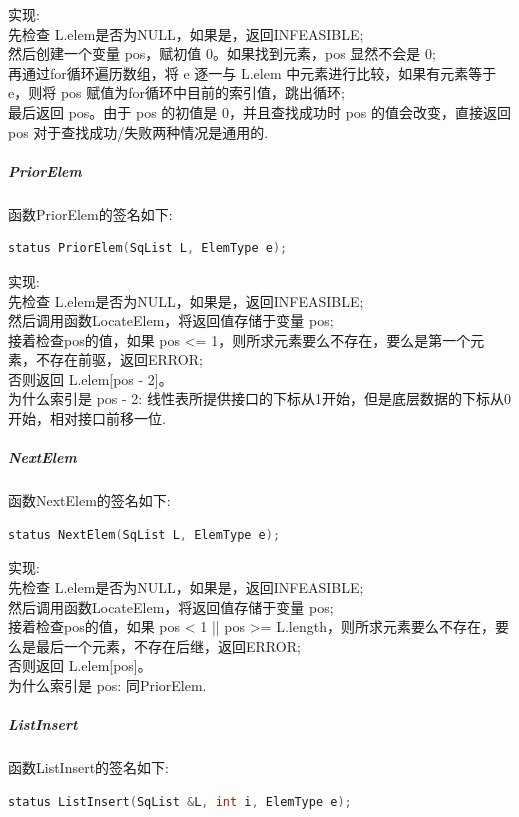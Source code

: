 \documentclass[supercite]{Experimental_Report}
\theoremstyle{definition}
\begin{document}
\noindent
实现: \\
先检查 L.elem是否为NULL，如果是，返回INFEASIBLE; \\
然后创建一个变量 pos，赋初值 0。如果找到元素，pos 显然不会是 0; \\
再通过for循环遍历数组，将 e 逐一与 L.elem 中元素进行比较，如果有元素等于 e，则将 pos 赋值为for循环中目前的索引值，跳出循环; \\
最后返回 pos。由于 pos 的初值是 0，并且查找成功时 pos 的值会改变，直接返回 pos 对于查找成功/失败两种情况是通用的.\\

\subparagraph{PriorElem}
\noindent
函数PriorElem的签名如下:
\begin{lstlisting}[language=C++, frame=single]
status PriorElem(SqList L, ElemType e);
\end{lstlisting}

\noindent
实现: \\
先检查 L.elem是否为NULL，如果是，返回INFEASIBLE; \\
然后调用函数LocateElem，将返回值存储于变量 pos; \\
接着检查pos的值，如果 pos <= 1，则所求元素要么不存在，要么是第一个元素，不存在前驱，返回ERROR; \\
否则返回 L.elem[pos - 2]。\\
为什么索引是 pos - 2: 线性表所提供接口的下标从1开始，但是底层数据的下标从0开始，相对接口前移一位.\\

\subparagraph{NextElem}
\noindent
函数NextElem的签名如下:
\begin{lstlisting}[language=C++, frame=single]
status NextElem(SqList L, ElemType e);
\end{lstlisting}

\noindent
实现: \\
先检查 L.elem是否为NULL，如果是，返回INFEASIBLE; \\
然后调用函数LocateElem，将返回值存储于变量 pos; \\
接着检查pos的值，如果 pos < 1 || pos >= L.length，则所求元素要么不存在，要么是最后一个元素，不存在后继，返回ERROR; \\
否则返回 L.elem[pos]。\\
为什么索引是 pos: 同PriorElem.\\

\subparagraph{ListInsert}
\noindent
函数ListInsert的签名如下:
\begin{lstlisting}[language=C++, frame=single]
status ListInsert(SqList &L, int i, ElemType e);
\end{lstlisting}
\end{document}
